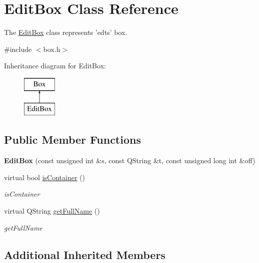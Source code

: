 \hypertarget{class_edit_box}{\section{Edit\-Box Class Reference}
\label{class_edit_box}
}


The \hyperlink{class_edit_box}{Edit\-Box} class represents 'edts' box.  




{\ttfamily \#include $<$box.\-h$>$}

Inheritance diagram for Edit\-Box\-:\begin{figure}[H]
\begin{center}
\leavevmode
\includegraphics[height=2.000000cm]{class_edit_box}
\end{center}
\end{figure}
\subsection*{Public Member Functions}
\begin{DoxyCompactItemize}
\item 
\hypertarget{class_edit_box_afaa947b3a71901bee92fff7b19c65ca9}{{\bfseries Edit\-Box} (const unsigned int \&s, const Q\-String \&t, const unsigned long int \&off)}\label{class_edit_box_afaa947b3a71901bee92fff7b19c65ca9}

\item 
virtual bool \hyperlink{class_edit_box_a839c13a43cc4250ffe9c9747a3318bb2}{is\-Container} ()
\begin{DoxyCompactList}\small\item\em is\-Container \end{DoxyCompactList}\item 
virtual Q\-String \hyperlink{class_edit_box_a13ccdc9edfcb00039f5785bf1d33b30e}{get\-Full\-Name} ()
\begin{DoxyCompactList}\small\item\em get\-Full\-Name \end{DoxyCompactList}\end{DoxyCompactItemize}
\subsection*{Additional Inherited Members}


